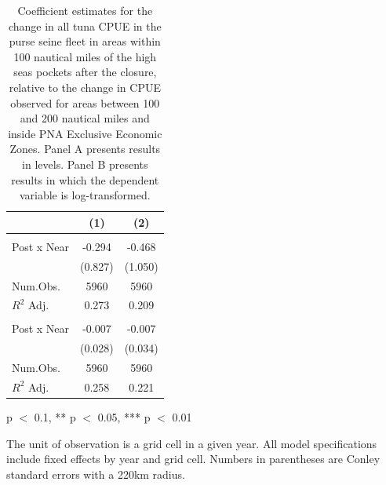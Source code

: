 \begin{table}
\centering
\begin{threeparttable}
\small
\caption{\label{tab:h3_reg_all_ps}Coefficient estimates for the change in all tuna CPUE in the purse seine fleet in
             areas within 100 nautical miles of the high seas pockets after the closure, relative to the change in CPUE
             observed for areas between 100 and 200 nautical miles and inside PNA Exclusive Economic Zones.
             Panel A presents results in levels. Panel B presents results in which the dependent variable is log-transformed.}
\centering
\begin{tabular}[t]{lcc}
\toprule
  & (1) & (2)\\
\midrule
\addlinespace[0.5em]
\multicolumn{3}{l}{\textit{A) Levels}}\\
\midrule \hspace{1em}Post x Near & -0.294 & -0.468\\
\hspace{1em} & (0.827) & (1.050)\\
\hspace{1em}Num.Obs. & 5960 & \vphantom{1} 5960\\
\hspace{1em}$R^2$ Adj. & 0.273 & 0.209\\
\addlinespace[0.5em]
\multicolumn{3}{l}{\textit{B) Log-transformed}}\\
\midrule \hspace{1em}Post x Near & -0.007 & -0.007\\
\hspace{1em} & (0.028) & (0.034)\\
\hspace{1em}Num.Obs. & 5960 & 5960\\
\hspace{1em}$R^2$ Adj. & 0.258 & 0.221\\
\bottomrule
\end{tabular}
\begin{tablenotes}
\small
\item * p $<$ 0.1, ** p $<$ 0.05, *** p $<$ 0.01
\item The unit of observation is a grid cell in a given year. All model specifications include fixed effects by year and grid cell. Numbers in parentheses are Conley standard errors with a 220km radius.
\end{tablenotes}
\end{threeparttable}
\end{table}
